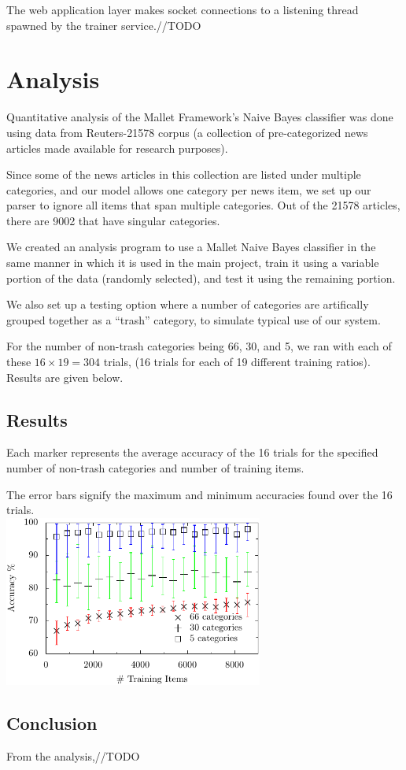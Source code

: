 \documentclass[letterpaper]{article}
\begin{document}
The web application layer makes socket connections to a listening thread spawned by the trainer service.//TODO

\section{Analysis}
Quantitative analysis of the Mallet Framework's Naive Bayes classifier was done using data from Reuters-21578 corpus \cite{Reuters21578} (a collection of pre-categorized news articles made available for research purposes).

Since some of the news articles in this collection are listed under multiple categories, and our model allows one category per news item, we set up our parser to ignore all items that span multiple categories. Out of the 21578 articles, there are 9002 that have singular categories.

We created an analysis program to use a Mallet Naive Bayes classifier in the same manner in which it is used in the main project, train it using a variable portion of the data (randomly selected), and test it using the remaining portion.

We also set up a testing option where a number of categories are artifically grouped together as a ``trash'' category, to simulate typical use of our system.

For the number of non-trash categories being 66, 30, and 5, we ran with each of these $16\times 19=304$ trials, (16 trials for each of 19 different training ratios). Results are given below.

\subsection{Results}
Each marker represents the average accuracy of the 16 trials for the specified number of non-trash categories and number of training items.

The error bars signify the maximum and minimum accuracies found over the 16 trials.\\

\noindent\includegraphics[width=3.35in]{data.pdf}

\subsection{Conclusion}
From the analysis,//TODO



\end{document}
